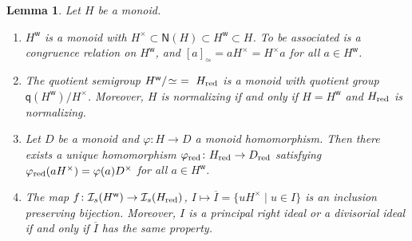 \documentclass[a4paper]{amsart}
\newtheorem{lemma}[theorem]{Lemma}
\theoremstyle{definition}
\numberwithin{equation}{section}
\begin{document}
\medskip
\begin{lemma} \label{4.4}
Let $H$ be a monoid.
\begin{enumerate}
\item $H^{\mathsf w}$ is a monoid with $H^{\times} \subset \mathsf N (H) \subset H^{\mathsf w} \subset H$.
      To be associated is a congruence relation on $H^{\mathsf w}$, and $[a]_{\simeq} =
      aH^{\times} = H^{\times}a$ for all $a \in H^{\mathsf w}$.

\smallskip
\item The quotient semigroup $H^{\mathsf w} /\negthinspace \simeq \ = \ H_{{\text{\rm red}}}$ is a monoid with quotient group $\mathsf q (H^{\mathsf w})/H^{\times}$.
      Moreover, $H$ is normalizing if and only if $H = H^{\mathsf w}$ and $H_{{\text{\rm red}}}$ is
      normalizing.

\smallskip
\item Let $D$ be a  monoid and $\varphi \colon H \to D$ a monoid homomorphism.
      Then there exists a unique homomorphism $\varphi_{{\text{\rm red}}} \colon H_{{\text{\rm red}}} \to D_{{\text{\rm red}}}$ satisfying $\varphi_{{\text{\rm red}}} (a H^{\times}) =
      \varphi (a) D^{\times}$ for all $a \in H^{\mathsf w}$.

\smallskip
\item The map $f \colon \mathcal I_s (H^{\mathsf w}) \to \mathcal
      I_s(H_{{\text{\rm red}}})$, $I \mapsto \overline I = \{ uH^{\times} \mid u \in I\}$ is an inclusion preserving
      bijection. Moreover, $I$ is a principal right ideal or a divisorial ideal if and
      only if $\overline I$ has the same property.
\end{enumerate}
\end{lemma}
\end{document}
